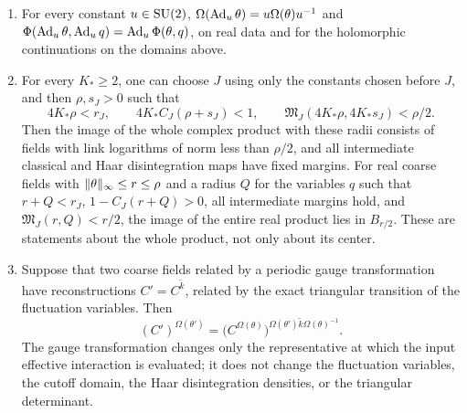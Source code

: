 \begin{theorem}
\begin{enumerate}
\item For every constant $u\in\mathrm{SU}(2)$, $\Omega(\operatorname{Ad}_u\theta)=u\Omega(\theta)u^{-1}$ and $\Phi(\operatorname{Ad}_u\theta,\operatorname{Ad}_uq)=\operatorname{Ad}_u\Phi(\theta,q)$, on real data and for the holomorphic continuations on the domains above.
\item For every $K_*\ge2$, one can choose $J$ using only the constants chosen before $J$, and then $\rho,s_J>0$ such that
\[
 4K_*\rho<r_J,\qquad 4K_*C_J(\rho+s_J)<1,\qquad \mathfrak M_J(4K_*\rho,4K_*s_J)<\rho/2.
\]
Then the image of the whole complex product with these radii consists of fields with link logarithms of norm less than $\rho/2$, and all intermediate classical and Haar disintegration maps have fixed margins. For real coarse fields with $\lVert \theta\rVert_\infty\le r\le\rho$ and a radius $Q$ for the variables $q$ such that $r+Q<r_J$, $1-C_J(r+Q)>0$, all intermediate margins hold, and $\mathfrak M_J(r,Q)<r/2$, the image of the entire real product lies in $B_{r/2}$. These are statements about the whole product, not only about its center.
\item Suppose that two coarse fields related by a periodic gauge transformation have reconstructions $C'=C^{\widetilde k}$, related by the exact triangular transition of the fluctuation variables. Then
\[
 (C')^{\Omega(\theta')}=\bigl(C^{\Omega(\theta)}\bigr)^{\Omega(\theta')\widetilde k\Omega(\theta)^{-1}}.
\]
The gauge transformation changes only the representative at which the input effective interaction is evaluated; it does not change the fluctuation variables, the cutoff domain, the Haar disintegration densities, or the triangular determinant.
\end{enumerate}
\end{theorem}


